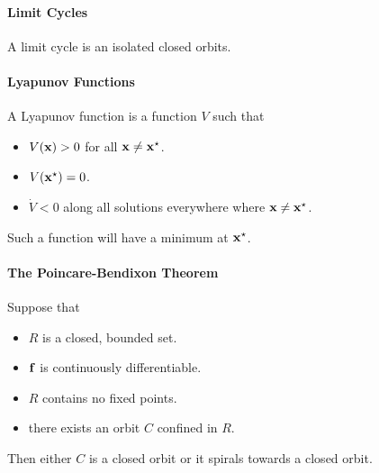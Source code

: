 \paragraph{Limit Cycles}
A limit cycle is an isolated closed orbits.

\paragraph{Lyapunov Functions}
A Lyapunov function is a function $V$ such that
\begin{itemize}
	\item $V(\vb{x}) > 0$ for all $\vb{x} \neq \vb{x}^{\star}$.
	\item $V(\vb{x}^{\star}) = 0$.
	\item $\dot{V} < 0$ along all solutions everywhere where $\vb{x} \neq \vb{x}^{\star}$.
\end{itemize}
Such a function will have a minimum at $\vb{x}^{\star}$.

\paragraph{The Poincare-Bendixon Theorem}
Suppose that
\begin{itemize}
	\item $R$ is a closed, bounded set.
	\item $\vb{f}$ is continuously differentiable.
	\item $R$ contains no fixed points.
	\item there exists an orbit $C$ confined in $R$.
\end{itemize}
Then either $C$ is a closed orbit or it spirals towards a closed orbit.